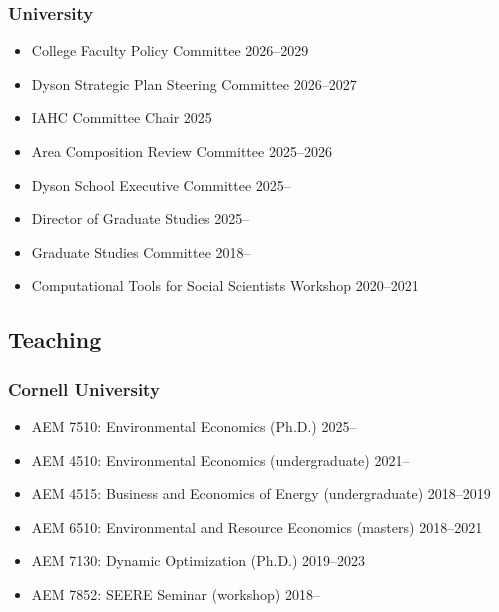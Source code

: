 \documentclass[11pt]{res} %
\begin{document}
\begin{resume}
\vspace{-.2in}

\subsubsection{University}
\begin{itemize} \itemsep -1pt
	\item[] College Faculty Policy Committee \hfill 2026--2029
	\item[] Dyson Strategic Plan Steering Committee \hfill 2026--2027
	\item[] IAHC Committee Chair \hfill 2025
	\item[] Area Composition Review Committee \hfill 2025--2026
	\item[] Dyson School Executive Committee \hfill 2025--
	\item[] Director of Graduate Studies \hfill 2025--
	\item[]	Graduate Studies Committee \hfill 2018--
	\item[] Computational Tools for Social Scientists Workshop \hfill 2020--2021
\end{itemize}

\vspace{-.2in}

\subsection{Teaching}\vspace{-.2in}
\subsubsection{Cornell University}
\begin{itemize} \itemsep -1pt
	\item[] AEM 7510: Environmental Economics (Ph.D.) \hfill 2025--
	\item[] AEM 4510: Environmental Economics (undergraduate) \hfill 2021--
	\item[] AEM 4515: Business and Economics of Energy (undergraduate) \hfill 2018--2019
	\item[] AEM 6510: Environmental and Resource Economics (masters) \hfill 2018--2021
	\item[] AEM 7130: Dynamic Optimization (Ph.D.) \hfill 2019--2023
	\item[] AEM 7852: SEERE Seminar (workshop) \hfill 2018--
\end{itemize}\vspace{-.3in}

\end{resume}
\end{document}
